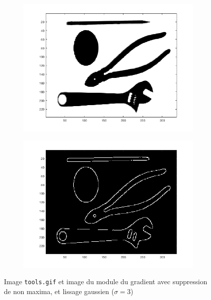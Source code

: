 \documentclass[a4paper]{article}
\begin{document}
\begin{figure}[H]
    \centering
    \begin{subfigure}[c]{0.46\textwidth}
        \centering
        \includegraphics[width=\textwidth]{images/tools.png}
    \end{subfigure}
    \begin{subfigure}[c]{0.46\textwidth}
        \centering
        \includegraphics[width=\textwidth]{images/tools_nms_gauss.png}
    \end{subfigure}
    \caption{Image \texttt{tools.gif} et image du module du gradient avec
    suppression de non maxima, et lissage gaussien ($\sigma = 3$)}
    \label{fig:tools-nms-gauss}
\end{figure}
\end{document}
